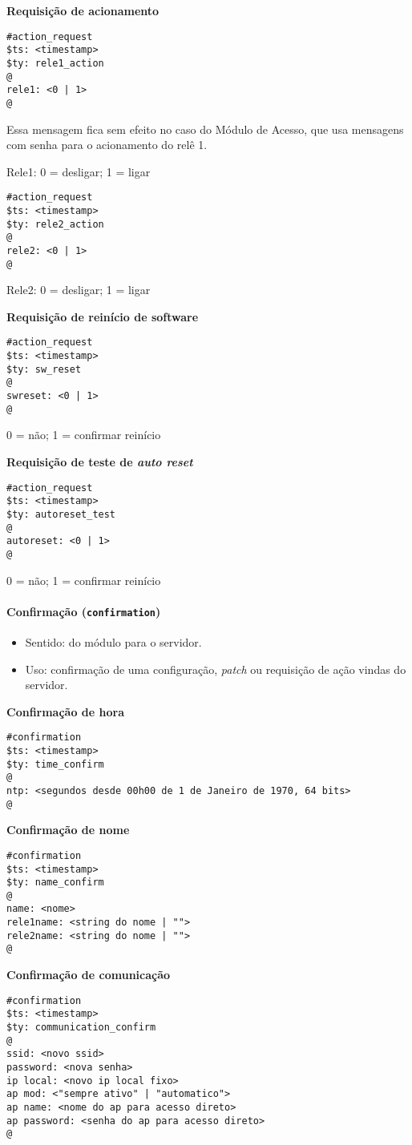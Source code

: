 \textbf{Requisição de acionamento}
\begin{lstlisting}
#action_request
$ts: <timestamp>
$ty: rele1_action
@
rele1: <0 | 1>
@
\end{lstlisting}
Essa mensagem fica sem efeito no caso do Módulo de Acesso, que usa mensagens com senha para o acionamento do relê 1.

Rele1: 0 = desligar; 1 = ligar

\begin{lstlisting}
#action_request
$ts: <timestamp>
$ty: rele2_action
@
rele2: <0 | 1>
@
\end{lstlisting}
Rele2: 0 = desligar; 1 = ligar

\textbf{Requisição de reinício de software}
\begin{lstlisting}
#action_request
$ts: <timestamp>
$ty: sw_reset
@
swreset: <0 | 1>
@
\end{lstlisting}
0 = não; 1 = confirmar reinício

\textbf{Requisição de teste de \emph{auto reset}}
\begin{lstlisting}
#action_request
$ts: <timestamp>
$ty: autoreset_test
@
autoreset: <0 | 1>
@
\end{lstlisting}
0 = não; 1 = confirmar reinício

\paragraph{Confirmação (\texttt{confirmation})}
\begin{itemize}
\item Sentido: do módulo para o servidor.
\item Uso: confirmação de uma configuração, \emph{patch} ou requisição de ação vindas do servidor.
\end{itemize}

\textbf{Confirmação de hora}
\begin{lstlisting}
#confirmation
$ts: <timestamp>
$ty: time_confirm
@
ntp: <segundos desde 00h00 de 1 de Janeiro de 1970, 64 bits>
@
\end{lstlisting}

\textbf{Confirmação de nome}
\begin{lstlisting}
#confirmation
$ts: <timestamp>
$ty: name_confirm
@
name: <nome>
rele1name: <string do nome | "">
rele2name: <string do nome | "">
@
\end{lstlisting}

\textbf{Confirmação de comunicação}
\begin{lstlisting}
#confirmation
$ts: <timestamp>
$ty: communication_confirm
@
ssid: <novo ssid>
password: <nova senha>
ip local: <novo ip local fixo>
ap mod: <"sempre ativo" | "automatico">
ap name: <nome do ap para acesso direto>
ap password: <senha do ap para acesso direto>
@
\end{lstlisting}

